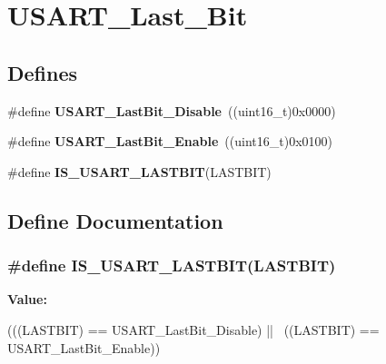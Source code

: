 \hypertarget{group__USART__Last__Bit}{
\section{USART\_\-Last\_\-Bit}
\label{group__USART__Last__Bit}
}
\subsection*{Defines}
\begin{DoxyCompactItemize}
\item 
\hypertarget{group__USART__Last__Bit_ga129c89b9e0dbb3ce43ee92589b3324e5}{
\#define {\bfseries USART\_\-LastBit\_\-Disable}~((uint16\_\-t)0x0000)}
\label{group__USART__Last__Bit_ga129c89b9e0dbb3ce43ee92589b3324e5}

\item 
\hypertarget{group__USART__Last__Bit_gaf8c19d1ce01c6efff8c24ee82cc7b52e}{
\#define {\bfseries USART\_\-LastBit\_\-Enable}~((uint16\_\-t)0x0100)}
\label{group__USART__Last__Bit_gaf8c19d1ce01c6efff8c24ee82cc7b52e}

\item 
\#define {\bfseries IS\_\-USART\_\-LASTBIT}(LASTBIT)
\end{DoxyCompactItemize}


\subsection{Define Documentation}
\hypertarget{group__USART__Last__Bit_gaa941695e5612b53e9c2aca6a9fa0d695}{
\subsubsection[{IS\_\-USART\_\-LASTBIT}]{\setlength{\rightskip}{0pt plus 5cm}\#define IS\_\-USART\_\-LASTBIT(LASTBIT)}}
\label{group__USART__Last__Bit_gaa941695e5612b53e9c2aca6a9fa0d695}
{\bfseries Value:}
\begin{DoxyCode}
(((LASTBIT) == USART_LastBit_Disable) || \
                                   ((LASTBIT) == USART_LastBit_Enable))
\end{DoxyCode}
